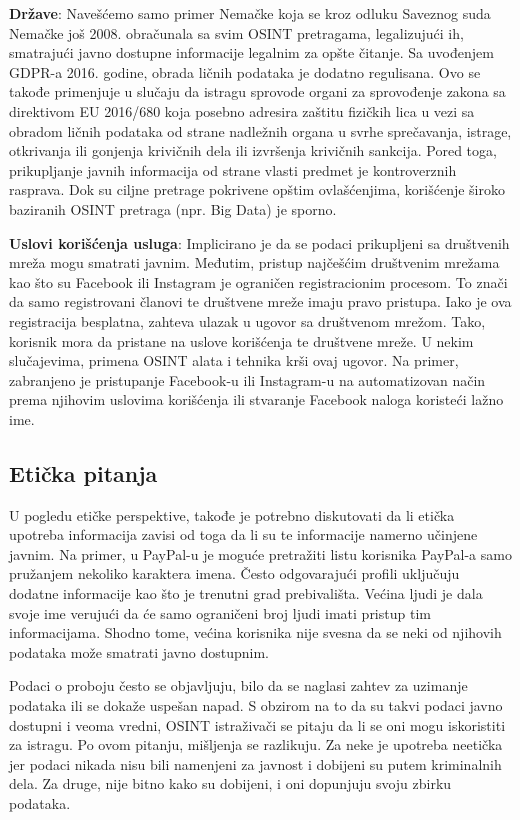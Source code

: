 \documentclass[fleqn, 12pt]{article}
\begin{document}
\textbf{Države}: Navešćemo samo primer Nemačke koja se kroz odluku Saveznog suda Nemačke još 2008. obračunala sa svim OSINT pretragama, legalizujući ih, smatrajući javno dostupne informacije legalnim za opšte čitanje.
Sa uvođenjem GDPR-a 2016. godine, obrada ličnih podataka je dodatno regulisana. Ovo se takođe primenjuje u slučaju da istragu sprovode organi za sprovođenje zakona sa direktivom EU 2016/680 koja posebno adresira zaštitu fizičkih lica u vezi sa obradom ličnih podataka od strane nadležnih organa u svrhe sprečavanja, istrage, otkrivanja ili gonjenja krivičnih dela ili izvršenja krivičnih sankcija.
Pored toga, prikupljanje javnih informacija od strane vlasti predmet je kontroverznih rasprava. Dok su ciljne pretrage pokrivene opštim ovlašćenjima, korišćenje široko baziranih OSINT pretraga (npr. Big Data) je sporno.\newline

\textbf{Uslovi korišćenja usluga}: Implicirano je da se podaci prikupljeni sa društvenih mreža mogu smatrati javnim. Međutim, pristup najčešćim društvenim mrežama kao što su Facebook ili Instagram je ograničen registracionim procesom. To znači da samo registrovani članovi te društvene mreže imaju pravo pristupa. Iako je ova registracija besplatna, zahteva ulazak u ugovor sa društvenom mrežom. Tako, korisnik mora da pristane na uslove korišćenja te društvene mreže. U nekim slučajevima, primena OSINT alata i tehnika krši ovaj ugovor. Na primer, zabranjeno je pristupanje Facebook-u ili Instagram-u na automatizovan način prema njihovim uslovima korišćenja ili stvaranje Facebook naloga koristeći lažno ime.
\subsection{Etička pitanja}
U pogledu etičke perspektive, takođe je potrebno diskutovati da li etička upotreba informacija zavisi od toga da li su te informacije namerno učinjene javnim. Na primer, u PayPal-u je moguće pretražiti listu korisnika PayPal-a samo pružanjem nekoliko karaktera imena. Često odgovarajući profili uključuju dodatne informacije kao što je trenutni grad prebivališta. Većina ljudi je dala svoje ime verujući da će samo ograničeni broj ljudi imati pristup tim informacijama. Shodno tome, većina korisnika nije svesna da se neki od njihovih podataka može smatrati javno dostupnim.\newline

Podaci o proboju često se objavljuju, bilo da se naglasi zahtev za uzimanje podataka ili se dokaže uspešan napad. S obzirom na to da su takvi podaci javno dostupni i veoma vredni, OSINT istraživači se pitaju da li se oni mogu iskoristiti za istragu. Po ovom pitanju, mišljenja se razlikuju. Za neke je upotreba neetička jer podaci nikada nisu bili namenjeni za javnost i dobijeni su putem kriminalnih dela. Za druge, nije bitno kako su dobijeni, i oni dopunjuju svoju zbirku podataka.\newpage
\end{document}
